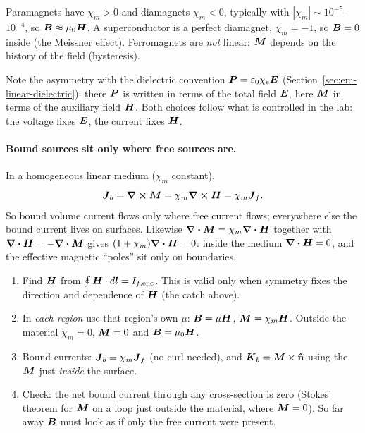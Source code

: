 Paramagnets have $\chi_m>0$ and diamagnets $\chi_m<0$, typically with $|\chi_m|\sim10^{-5}$--$10^{-4}$, so $\vect{B}\approx\mu_0\vect{H}$. A superconductor is a perfect diamagnet, $\chi_m = -1$, so $\vect{B} = 0$ inside (the Meissner effect). Ferromagnets are \emph{not} linear: $\vect{M}$ depends on the history of the field (hysteresis).

Note the asymmetry with the dielectric convention $\vect{P} = \varepsilon_0\chi_e\vect{E}$ (Section~\ref{sec:em-linear-dielectric}): there $\vect{P}$ is written in terms of the total field $\vect{E}$, here $\vect{M}$ in terms of the auxiliary field $\vect{H}$. Both choices follow what is controlled in the lab: the voltage fixes $\vect{E}$, the current fixes $\vect{H}$.

\paragraph{Bound sources sit only where free sources are.} In a homogeneous linear medium ($\chi_m$ constant),
\[
    \vect{J}_b = \curl\vect{M} = \chi_m\curl\vect{H} = \chi_m\vect{J}_f .
\]
So bound volume current flows only where free current flows; everywhere else the bound current lives on surfaces. Likewise $\div\vect{M} = \chi_m\div\vect{H}$ together with $\div\vect{H} = -\div\vect{M}$ gives $(1+\chi_m)\div\vect{H} = 0$: inside the medium $\div\vect{H} = 0$, and the effective magnetic ``poles'' sit only on boundaries.

\begin{fact}
\leavevmode
\begin{enumerate}
    \item Find $\vect{H}$ from $\oint\vect{H}\cdot d\lvect{l} = I_{f,\text{enc}}$. This is valid only when symmetry fixes the direction and dependence of $\vect{H}$ (the catch above).
    \item In \emph{each region} use that region's own $\mu$: $\vect{B} = \mu\vect{H}$, $\vect{M} = \chi_m\vect{H}$. Outside the material $\chi_m = 0$, $\vect{M} = 0$ and $\vect{B} = \mu_0\vect{H}$.
    \item Bound currents: $\vect{J}_b = \chi_m\vect{J}_f$ (no curl needed), and $\vect{K}_b = \vect{M}\times\uvect{n}$ using the $\vect{M}$ just \emph{inside} the surface.
    \item Check: the net bound current through any cross-section is zero (Stokes' theorem for $\vect{M}$ on a loop just outside the material, where $\vect{M} = 0$). So far away $\vect{B}$ must look as if only the free current were present.
\end{enumerate}
\end{fact}


